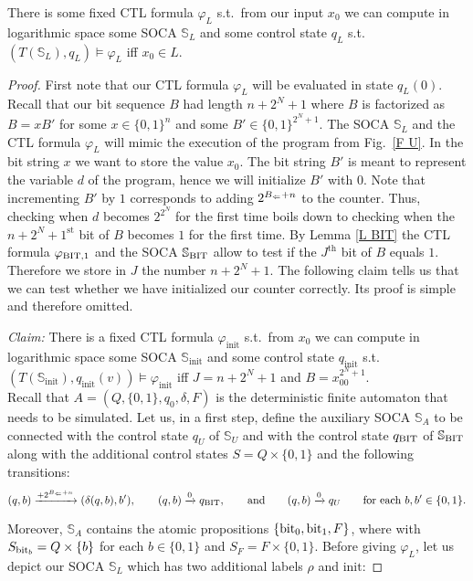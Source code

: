 \documentclass[times,envcountsame]{llncs}
\newcommand{\Soca}{\mathbb{S}}
\begin{document}
\begin{lemma}
There is some fixed CTL formula $\varphi_L$ s.t.\ from our input $x_0$
we can compute in logarithmic space some SOCA $\Soca_L$ and some
control state $q_L$ s.t.\ $(T(\Soca_L),q_L)\models\varphi_L$
iff $x_0\in L$.
\end{lemma}
\begin{proof}
First note that our CTL formula $\varphi_L$ will be evaluated in state $q_L(0)$.
Recall that our bit sequence $B$ had length $n+2^N+1$ where $B$ is factorized
as $B=xB'$
for some $x\in\{0,1\}^n$ and some $B'\in\{0,1\}^{2^N+1}$.
The SOCA $\Soca_L$ and the CTL formula $\varphi_L$ will mimic the execution
of the program from Fig.\ \ref{F U}.
In the bit string $x$ we want to store the value $x_0$.
The bit string $B'$ is meant to represent
the variable $d$ of the program, hence we will initialize
$B'$ with $0$.
Note that incrementing $B'$ by $1$ corresponds to adding $2^{B_\Leftarrow+n}$ to the counter.
Thus, checking when $d$ becomes $2^{2^N}$ for the first time boils down to checking
when the $n+2^N+1^{\text{st}}$ bit of $B$ becomes $1$ for the first time.
 By Lemma
\ref{L BIT} the CTL formula $\varphi_{\text{BIT},1}$ and the SOCA $\Soca_\BIT$ allow to test
if the $J^{\text{th}}$ bit of $B$ equals $1$.
Therefore we store in $J$ the number $n+2^N+1$.
The following claim tells us that we can test whether we have
initialized our counter correctly.
Its proof is simple and therefore omitted.
\newcommand{\init}{\text{init}}

\medskip

\noindent
{\em Claim:} There is a fixed CTL formula $\varphi_\init$ s.t.\ from
$x_0$ we can compute in logarithmic space some SOCA $\Soca_\init$ and
some control state $q_\init$ s.t.\
$(T(\Soca_\init),q_\init(v))\models\varphi_\init$
iff $J=n+2^N+1$ and $B=x_00^{2^N+1}$.\\

\noindent
Recall that $A=(Q,\{0,1\},q_0,\delta,F)$ is the deterministic finite automaton
that needs to be simulated.
Let us, in a first step, define the auxiliary SOCA $\Soca_A$
to be connected with the control state $q_U$ of $\Soca_U$ and with the control
state $q_{\text{BIT}}$ of $\Soca_\BIT$ along with the additional
control states $S=Q\times\{0,1\}$ and
the following transitions:
$$
(q,b)\xrightarrow{+2^{B_\Leftarrow+n}}(\delta(q,b),b'),\qquad
(q,b)\xrightarrow{0}q_{\text{BIT}},\qquad\text{and}\qquad
(q,b)\xrightarrow{0}q_U\qquad\text{for each }
b,b'\in\{0,1\}.
$$

\noindent
Moreover, $\Soca_A$ contains the atomic propositions
$\{\text{bit}_0,\text{bit}_1,F\}$, where with $S_{\text{bit}_b}=Q\times\{b\}$ for each $b\in\{0,1\}$ and
$S_F=F\times\{0,1\}$.
Before giving $\varphi_L$, let us depict our SOCA $\Soca_L$ which has
two additional labels $\rho$ and $\init$:


\end{proof}
\end{document}
